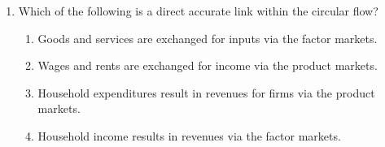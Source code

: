 \documentclass[12pt]{article}
\begin{document}
\begin{enumerate}[label=\arabic*.]
\begin{enumerate}[label=(\alph*)]
    \item increases decreases surplus
    \item increases decreases deficit
    \item decreases decreases surplus
    \item decreases increases deficit
\end{enumerate}
\item Which of the following is a direct accurate link within the circular flow?
\begin{enumerate}[label=(\alph*)]
    \item Goods and services are exchanged for inputs via the factor markets.
    \item Wages and rents are exchanged for income via the product markets.
    \item Household expenditures result in revenues for firms via the product markets.
    \item Household income results in revenues via the factor markets.
\end{enumerate}
\end{enumerate}
\end{document}
